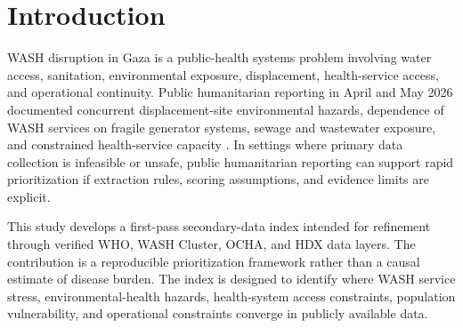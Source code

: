 \section{Introduction}

WASH disruption in Gaza is a public-health systems problem involving water access, sanitation, environmental exposure, displacement, health-service access, and operational continuity. Public humanitarian reporting in April and May 2026 documented concurrent displacement-site environmental hazards, dependence of WASH services on fragile generator systems, sewage and wastewater exposure, and constrained health-service capacity \citep{ocha_2026_apr17,ocha_2026_may15}. In settings where primary data collection is infeasible or unsafe, public humanitarian reporting can support rapid prioritization if extraction rules, scoring assumptions, and evidence limits are explicit.

This study develops a first-pass secondary-data index intended for refinement through verified WHO, WASH Cluster, OCHA, and HDX data layers. The contribution is a reproducible prioritization framework rather than a causal estimate of disease burden. The index is designed to identify where WASH service stress, environmental-health hazards, health-system access constraints, population vulnerability, and operational constraints converge in publicly available data.
